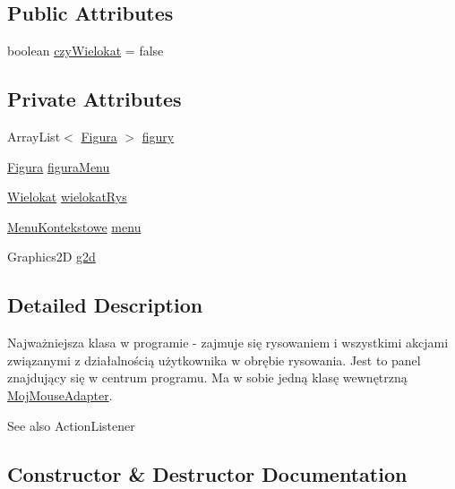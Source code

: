 \subsection*{Public Attributes}
\begin{DoxyCompactItemize}
\item 
boolean \mbox{\hyperlink{classlista__5_1_1_wnetrze_aafcbd167c4a739f34f4c8420f41e7290}{czy\+Wielokat}} = false
\end{DoxyCompactItemize}
\subsection*{Private Attributes}
\begin{DoxyCompactItemize}
\item 
Array\+List$<$ \mbox{\hyperlink{interfacelista__5_1_1_figura}{Figura}} $>$ \mbox{\hyperlink{classlista__5_1_1_wnetrze_abeebc1924e88a0d99f63f06989b26de6}{figury}}
\item 
\mbox{\hyperlink{interfacelista__5_1_1_figura}{Figura}} \mbox{\hyperlink{classlista__5_1_1_wnetrze_a9ca273969f43e95e7cbb14771b661832}{figura\+Menu}}
\item 
\mbox{\hyperlink{classlista__5_1_1_wielokat}{Wielokat}} \mbox{\hyperlink{classlista__5_1_1_wnetrze_a6f5256e1e24b7cc70ea083655a3e649b}{wielokat\+Rys}}
\item 
\mbox{\hyperlink{classlista__5_1_1_menu_kontekstowe}{Menu\+Kontekstowe}} \mbox{\hyperlink{classlista__5_1_1_wnetrze_a3b82cd912cfe874fd313ffc40687ddf6}{menu}}
\item 
Graphics2D \mbox{\hyperlink{classlista__5_1_1_wnetrze_a7aa207b33c99ffe3b8f8e4a2f7e22632}{g2d}}
\end{DoxyCompactItemize}


\subsection{Detailed Description}
Najważniejsza klasa w programie -\/ zajmuje się rysowaniem i wszystkimi akcjami związanymi z działalnością użytkownika w obrębie rysowania. Jest to panel znajdujący się w centrum programu. Ma w sobie jedną klasę wewnętrzną \mbox{\hyperlink{classlista__5_1_1_wnetrze_1_1_moj_mouse_adapter}{Moj\+Mouse\+Adapter}}.

\begin{DoxySeeAlso}{See also}
Action\+Listener 
\end{DoxySeeAlso}


\subsection{Constructor \& Destructor Documentation}
\mbox{\label{classlista__5_1_1_wnetrze_a7fc5065e5b578f1613050a099df86864}} 
